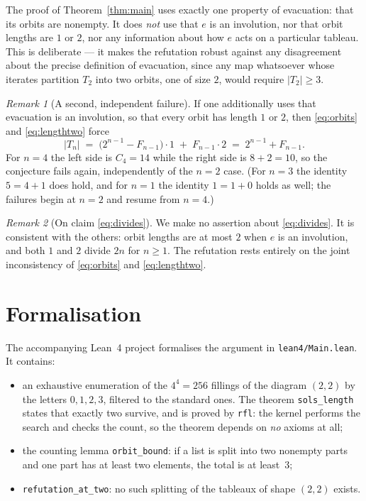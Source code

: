 \documentclass[11pt]{article}
\theoremstyle{remark}
\newtheorem{remark}{Remark}
\begin{document}
The proof of Theorem~\ref{thm:main} uses exactly one property of evacuation:
that its orbits are nonempty. It does \emph{not} use that $e$ is an involution,
nor that orbit lengths are $1$ or $2$, nor any information about how $e$ acts on
a particular tableau. This is deliberate --- it makes the refutation robust
against any disagreement about the precise definition of evacuation, since any
map whatsoever whose iterates partition $T_2$ into two orbits, one of size $2$,
would require $|T_2| \ge 3$.

\begin{remark}[A second, independent failure]
If one additionally uses that evacuation is an involution, so that every orbit
has length $1$ or $2$, then \eqref{eq:orbits} and \eqref{eq:lengthtwo} force
\[
  |T_n| \;=\; \bigl(2^{n-1} - F_{n-1}\bigr)\cdot 1 \;+\; F_{n-1}\cdot 2
  \;=\; 2^{n-1} + F_{n-1}.
\]
For $n = 4$ the left side is $C_4 = 14$ while the right side is $8 + 2 = 10$, so
the conjecture fails again, independently of the $n = 2$ case. (For $n = 3$ the
identity $5 = 4 + 1$ does hold, and for $n = 1$ the identity $1 = 1 + 0$ holds
as well; the failures begin at $n = 2$ and resume from $n = 4$.)
\end{remark}

\begin{remark}[On claim \eqref{eq:divides}]
We make no assertion about \eqref{eq:divides}. It is consistent with the
others: orbit lengths are at most $2$ when $e$ is an involution, and both $1$
and $2$ divide $2n$ for $n \ge 1$. The refutation rests entirely on the
joint inconsistency of \eqref{eq:orbits} and \eqref{eq:lengthtwo}.
\end{remark}

\section{Formalisation}

The accompanying Lean~4 project formalises the argument in
\texttt{lean4/Main.lean}. It contains:

\begin{itemize}
  \item an exhaustive enumeration of the $4^4 = 256$ fillings of the diagram
        $(2,2)$ by the letters $0,1,2,3$, filtered to the standard ones. The
        theorem \texttt{sols\_length} states that exactly two survive, and is
        proved by \texttt{rfl}: the kernel performs the search and checks the
        count, so the theorem depends on \emph{no} axioms at all;
  \item the counting lemma \texttt{orbit\_bound}: if a list is split into two
        nonempty parts and one part has at least two elements, the total is at
        least~$3$;
  \item \texttt{refutation\_at\_two}: no such splitting of the tableaux of shape
        $(2,2)$ exists.
\end{itemize}
\end{document}
